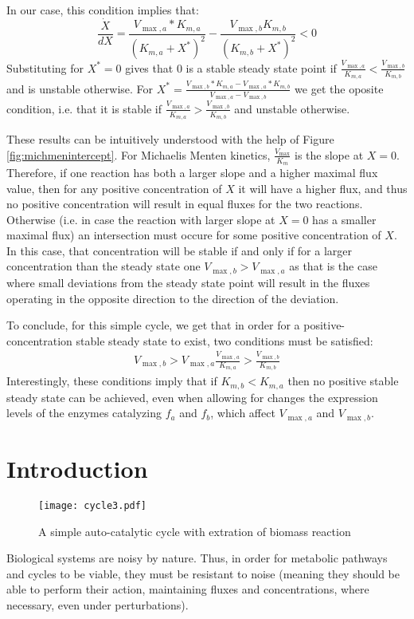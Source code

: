 \documentclass[a4page,notitlepage]{article}
\begin{document}
    In our case, this condition implies that:
    \begin{equation*}
      \frac{\dot X}{dX} = \frac{V_{\max,a}*K_{m,a}}{(K_{m,a}+X^*)^2}-\frac{V_{\max,b}K_{m,b}}{(K_{m,b}+X^*)^2}<0
    \end{equation*}
    Substituting for $X^*=0$ gives that $0$ is a stable steady state point if $\frac{V_{\max,a}}{K_{m,a}}<\frac{V_{\max,b}}{K_{m,b}}$ and is unstable otherwise.
    For $X^*=\frac{V_{\max,b}*K_{m,a}-V_{\max,a}*K_{m,b}}{V_{\max,a}-V_{\max,b}}$ we get the oposite condition, i.e. that it is stable if $\frac{V_{\max,a}}{K_{m,a}}>\frac{V_{\max,b}}{K_{m,b}}$ and unstable otherwise.
    
    These results can be intuitively understood with the help of Figure \ref{fig:michmenintercept}.
    For Michaelis Menten kinetics, $\frac{V_\max}{K_m}$ is the slope at $X=0$.
    Therefore, if one reaction has both a larger slope and a higher maximal flux value, then for any positive concentration of $X$ it will have a higher flux, and thus no positive concentration will result in equal fluxes for the two reactions.
    Otherwise (i.e. in case the reaction with larger slope at $X=0$ has a smaller maximal flux) an intersection must occure for some positive concentration of $X$.
    In this case, that concentration will be stable if and only if for a larger concentration than the steady state one $V_{\max,b}>V_{\max,a}$ as that is the case where small deviations from the steady state point will result in the fluxes operating in the opposite direction to the direction of the deviation.

    To conclude, for this simple cycle, we get that in order for a positive-concentration stable steady state to exist, two conditions must be satisfied:
    \begin{eqnarray*}
        V_{\max,b}>V_{\max,a}
        \frac{V_{\max,a}}{K_{m,a}}>\frac{V_{\max,b}}{K_{m,b}}
    \end{eqnarray*}
    Interestingly, these conditions imply that if $K_{m,b}<K_{m,a}$ then no positive stable steady state can be achieved, even when allowing for  changes the expression levels of the enzymes catalyzing $f_a$ and $f_b$, which affect $V_{\max,a}$ and $V_{\max,b}$.
    

\section{Introduction}
\begin{figure}[h]
\centering
\texttt{[image: cycle3.pdf]}
\caption{A simple auto-catalytic cycle with extration of biomass reaction}
\label{fig:autocatal}
\end{figure}
Biological systems are noisy by nature.
Thus, in order for metabolic pathways and cycles to be viable, they must be resistant to noise (meaning they should be able to perform their action, maintaining fluxes and concentrations, where necessary, even under perturbations).
\end{document}
